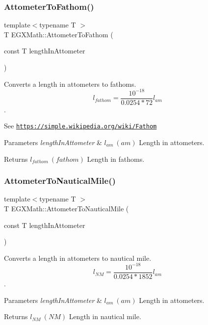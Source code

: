 \subsubsection{\texorpdfstring{Attometer\+To\+Fathom()}{AttometerToFathom()}}
{\footnotesize\ttfamily template$<$typename T $>$ \\
T E\+G\+X\+Math\+::\+Attometer\+To\+Fathom (\begin{DoxyParamCaption}\item[{const T}]{length\+In\+Attometer }\end{DoxyParamCaption})}



Converts a length in attometers to fathoms. \[ l_{fathom}= \frac{10^{-18}}{0.0254 * 72} l_{am} \]. 

See \href{https://simple.wikipedia.org/wiki/Fathom}{\tt https\+://simple.\+wikipedia.\+org/wiki/\+Fathom} 
\begin{DoxyParams}{Parameters}
{\em length\+In\+Attometer} & $ l_{am}\ (am)$ Length in attometers. \\
\hline
\end{DoxyParams}
\begin{DoxyReturn}{Returns}
$ l_{fathom}\ (fathom)$ Length in fathoms. 
\end{DoxyReturn}
\mbox{\label{group___e_g_x_math-_conversions-_length_conversions-_attometer-_nautical_ga38f0b72d347141e8740bcf9d84a08d25}} 
\subsubsection{\texorpdfstring{Attometer\+To\+Nautical\+Mile()}{AttometerToNauticalMile()}}
{\footnotesize\ttfamily template$<$typename T $>$ \\
T E\+G\+X\+Math\+::\+Attometer\+To\+Nautical\+Mile (\begin{DoxyParamCaption}\item[{const T}]{length\+In\+Attometer }\end{DoxyParamCaption})}



Converts a length in attometers to nautical mile. \[ l_{NM}= \frac{10^{-18}}{0.0254 * 1852} l_{am} \]. 


\begin{DoxyParams}{Parameters}
{\em length\+In\+Attometer} & $ l_{am}\ (am)$ Length in attometers. \\
\hline
\end{DoxyParams}
\begin{DoxyReturn}{Returns}
$ l_{NM}\ (NM)$ Length in nautical mile. 
\end{DoxyReturn}
